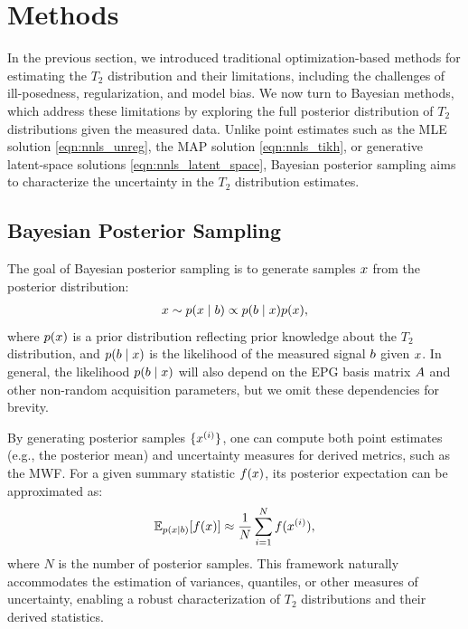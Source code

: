 \section{Methods}\label{sec:methods}

In the previous section, we introduced traditional optimization-based methods for estimating the $T_2$ distribution and their limitations, including the challenges of ill-posedness, regularization, and model bias.
We now turn to Bayesian methods, which address these limitations by exploring the full posterior distribution of $T_2$ distributions given the measured data.
Unlike point estimates such as the \gls*{MLE} solution \eqref{eqn:nnls_unreg}, the \gls*{MAP} solution \eqref{eqn:nnls_tikh}, or generative latent-space solutions \eqref{eqn:nnls_latent_space}, Bayesian posterior sampling aims to characterize the uncertainty in the $T_2$ distribution estimates.

\subsection{Bayesian Posterior Sampling}\label{subsec:posterior_sampling}

The goal of Bayesian posterior sampling is to generate samples $x$ from the posterior distribution:
\begin{align}\label{eqn:posterior_sampling_general}
    x \sim p(x \mid b) \propto p(b \mid x) p(x),
\end{align}
where $p(x)$ is a prior distribution reflecting prior knowledge about the $T_2$ distribution, and $p(b \mid x)$ is the likelihood of the measured signal $b$ given $x$.
In general, the likelihood $p(b \mid x)$ will also depend on the \gls*{EPG} basis matrix $A$ and other non-random acquisition parameters, but we omit these dependencies for brevity.

By generating posterior samples $\{x^{(i)}\}$, one can compute both point estimates (e.g., the posterior mean) and uncertainty measures for derived metrics, such as the \gls*{MWF}.
For a given summary statistic $f(x)$, its posterior expectation can be approximated as:
\begin{align}
    \mathbb{E}_{p(x \mid b)} [f(x)] \approx \frac{1}{N} \sum_{i=1}^{N} f(x^{(i)}),
\end{align}
where $N$ is the number of posterior samples.
This framework naturally accommodates the estimation of variances, quantiles, or other measures of uncertainty, enabling a robust characterization of $T_2$ distributions and their derived statistics.

